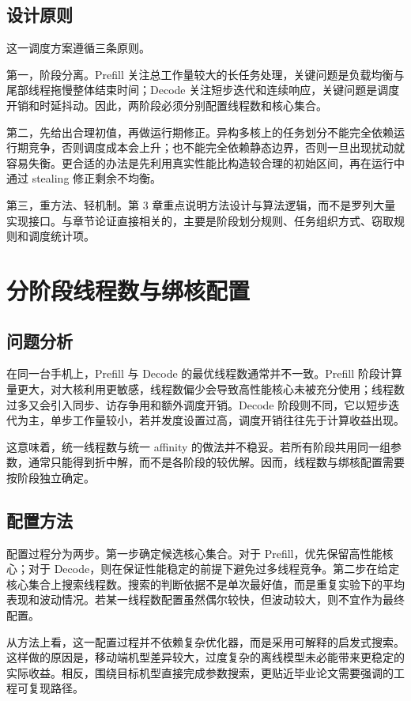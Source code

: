\subsection{设计原则}

这一调度方案遵循三条原则。

第一，阶段分离。Prefill 关注总工作量较大的长任务处理，关键问题是负载均衡与尾部线程拖慢整体结束时间；Decode 关注短步迭代和连续响应，关键问题是调度开销和时延抖动。因此，两阶段必须分别配置线程数和核心集合。

第二，先给出合理初值，再做运行期修正。异构多核上的任务划分不能完全依赖运行期竞争，否则调度成本会上升；也不能完全依赖静态边界，否则一旦出现扰动就容易失衡。更合适的办法是先利用真实性能比构造较合理的初始区间，再在运行中通过 stealing 修正剩余不均衡。

第三，重方法、轻机制。第 3 章重点说明方法设计与算法逻辑，而不是罗列大量实现接口。与章节论证直接相关的，主要是阶段划分规则、任务组织方式、窃取规则和调度统计项。

\section{分阶段线程数与绑核配置}

\subsection{问题分析}

在同一台手机上，Prefill 与 Decode 的最优线程数通常并不一致。Prefill 阶段计算量更大，对大核利用更敏感，线程数偏少会导致高性能核心未被充分使用；线程数过多又会引入同步、访存争用和额外调度开销。Decode 阶段则不同，它以短步迭代为主，单步工作量较小，若并发度设置过高，调度开销往往先于计算收益出现。

这意味着，统一线程数与统一 affinity 的做法并不稳妥。若所有阶段共用同一组参数，通常只能得到折中解，而不是各阶段的较优解。因而，线程数与绑核配置需要按阶段独立确定。

\subsection{配置方法}

配置过程分为两步。第一步确定候选核心集合。对于 Prefill，优先保留高性能核心；对于 Decode，则在保证性能稳定的前提下避免过多线程竞争。第二步在给定核心集合上搜索线程数。搜索的判断依据不是单次最好值，而是重复实验下的平均表现和波动情况。若某一线程数配置虽然偶尔较快，但波动较大，则不宜作为最终配置。

从方法上看，这一配置过程并不依赖复杂优化器，而是采用可解释的启发式搜索。这样做的原因是，移动端机型差异较大，过度复杂的离线模型未必能带来更稳定的实际收益。相反，围绕目标机型直接完成参数搜索，更贴近毕业论文需要强调的工程可复现路径。

